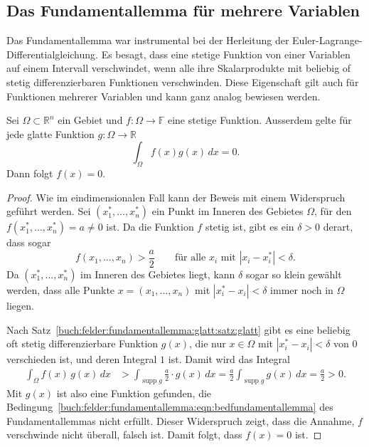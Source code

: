 %
%
%

%
%
\subsection{Das Fundamentallemma für mehrere Variablen}
Das Fundamentallemma war instrumental bei der Herleitung der
Euler-Lagrange-Dif\-fe\-ren\-tial\-glei\-chung.
Es besagt, dass eine stetige Funktion von einer Variablen auf einem Intervall
verschwindet, wenn alle ihre Skalarprodukte mit beliebig of stetig
differenzierbaren Funktionen verschwinden.
Diese Eigenschaft gilt auch für Funktionen mehrerer Variablen und kann
ganz analog bewiesen werden.

\begin{satz}[Fundamentallemma]
Sei $\Omega\subset\mathbb{R}^n$ ein Gebiet und $f\colon \Omega\to\mathbb{F}$
eine stetige Funktion.
Ausserdem gelte für jede glatte Funktion $g\colon\Omega\to\mathbb{R}$ 
\begin{equation}
\int_{\Omega} f(x)g(x)\,dx = 0.
\label{buch:felder:fundamentallemma:eqn:bedfundamentallemma}
\end{equation}
Dann folgt $f(x)=0$.
\end{satz}

\begin{proof}
Wie im eindimensionalen Fall kann der Beweis mit einem Widerspruch
geführt werden.
Sei $(x^*_1,\dots,x^*_n)$ ein Punkt im Inneren des Gebietes $\Omega$,
für den $f(x^*_1,\dots,x^*_n)=a\ne 0$ ist.
Da die Funktion $f$ stetig ist, gibt es ein $\delta>0$ derart,
dass sogar
\[
f(x_1,\dots,x_n) > \frac{a}2
\qquad\text{für alle $x_i$ mit $|x_i-x^*_i|<\delta$.}
\]
Da $(x^*_1,\dots,x^*_n)$ im Inneren des Gebietes liegt, kann 
$\delta$ sogar so klein gewählt werden, dass alle Punkte
$x=(x_1,\dots,x_n)$ mit $|x^*_i-x_i|<\delta$ immer noch in
$\Omega$ liegen.

Nach Satz~\ref{buch:felder:fundamentallemma:glatt:satz:glatt}
gibt es eine beliebig oft stetig differenzierbare Funktion $g(x)$,
die nur $x\in\Omega$ mit $|x^*_i-x_i|<\delta$ von $0$ verschieden ist,
und deren Integral $1$ ist.
Damit wird das 
Integral
\begin{align*}
\int_{\Omega} f(x)\,g(x)\,dx
&>
\int_{\operatorname{supp}g}
\frac{a}2
\cdot
g(x)
\,dx
=
\frac{a}2
\int_{\operatorname{supp}g}
g(x)
\,dx
=
\frac{a}2>0.
\end{align*}
Mit $g(x)$ ist also eine Funktion gefunden, die
Bedingung~\eqref{buch:felder:fundamentallemma:eqn:bedfundamentallemma}
des Fundamentallemmas nicht erfüllt.
Dieser Widerspruch zeigt, dass die Annahme, $f$ verschwinde nicht überall,
falsch ist.
Damit folgt, dass $f(x)=0$ ist.
\end{proof}




